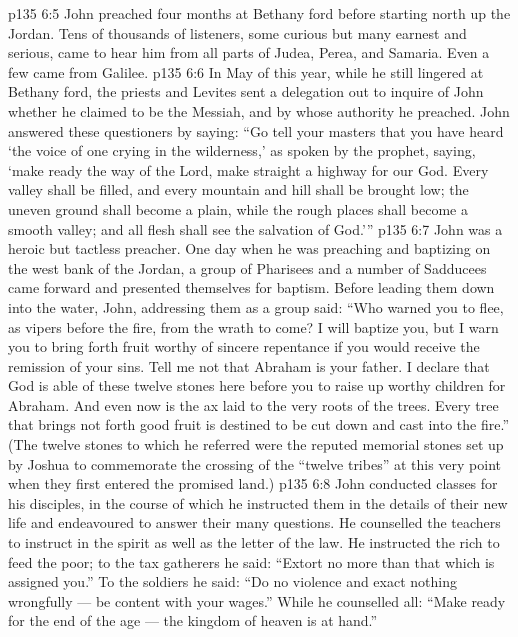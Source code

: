 \vs p135 6:5 John preached four months at Bethany ford before starting north up the Jordan. Tens of thousands of listeners, some curious but many earnest and serious, came to hear him from all parts of Judea, Perea, and Samaria. Even a few came from Galilee.
\vs p135 6:6 In May of this year, while he still lingered at Bethany ford, the priests and Levites sent a delegation out to inquire of John whether he claimed to be the Messiah, and by whose authority he preached. John answered these questioners by saying: “Go tell your masters that you have heard ‘the voice of one crying in the wilderness,’ as spoken by the prophet, saying, ‘make ready the way of the Lord, make straight a highway for our God. Every valley shall be filled, and every mountain and hill shall be brought low; the uneven ground shall become a plain, while the rough places shall become a smooth valley; and all flesh shall see the salvation of God.’”
\vs p135 6:7 John was a heroic but tactless preacher. One day when he was preaching and baptizing on the west bank of the Jordan, a group of Pharisees and a number of Sadducees came forward and presented themselves for baptism. Before leading them down into the water, John, addressing them as a group said: “Who warned you to flee, as vipers before the fire, from the wrath to come? I will baptize you, but I warn you to bring forth fruit worthy of sincere repentance if you would receive the remission of your sins. Tell me not that Abraham is your father. I declare that God is able of these twelve stones here before you to raise up worthy children for Abraham. And even now is the ax laid to the very roots of the trees. Every tree that brings not forth good fruit is destined to be cut down and cast into the fire.” (The twelve stones to which he referred were the reputed memorial stones set up by Joshua to commemorate the crossing of the “twelve tribes” at this very point when they first entered the promised land.)
\vs p135 6:8 John conducted classes for his disciples, in the course of which he instructed them in the details of their new life and endeavoured to answer their many questions. He counselled the teachers to instruct in the spirit as well as the letter of the law. He instructed the rich to feed the poor; to the tax gatherers he said: “Extort no more than that which is assigned you.” To the soldiers he said: “Do no violence and exact nothing wrongfully --- be content with your wages.” While he counselled all: “Make ready for the end of the age --- the kingdom of heaven is at hand.”
